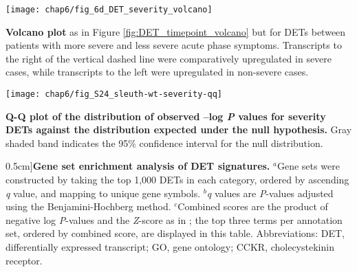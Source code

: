 \begin{marginfigure}[-9.5cm]
  \centering
  \texttt{[image: chap6/fig\_6d\_DET\_severity\_volcano]}
  \caption[Volcano plot of differentially expressed host transcripts for symptom severity]{
  \textbf{Volcano plot} as in Figure \ref{fig:DET_timepoint_volcano} but for DETs between patients with more severe and less severe acute phase symptoms. Transcripts to the right of the vertical dashed line were comparatively upregulated in severe cases, while transcripts to the left were upregulated in non-severe cases. 
  }
  \label{fig:DET_severity_volcano}
\end{marginfigure}
\begin{marginfigure}[-1cm]
  \centering
  \texttt{[image: chap6/fig\_S24\_sleuth-wt-severity-qq]}
  \caption[Q-Q plot of the distribution of observed –log \emph{P} values for severity DETs against the distribution expected under the null hypothesis]{
    \textbf{Q-Q plot of the distribution of observed –log \emph{P} values for severity DETs against the distribution expected under the null hypothesis.} Gray shaded band indicates the 95\% confidence interval for the null distribution.
  }
  \label{fig:DET_severity_qq}
\end{marginfigure}
\begin{table*}[htb]
  
  \caption[Gene set enrichment analysis of DET signatures][0.5cm]{\textbf{Gene set enrichment analysis of DET signatures.}
  $^a$Gene sets were constructed by taking the top 1,000 DETs in each category, ordered by ascending \emph{q} value, and mapping to unique gene symbols. $^b$\emph{q} values are \emph{P}-values adjusted using the Benjamini-Hochberg method. $^c$Combined scores are the product of negative log \emph{P}-values and the \emph{Z}-score as in \textcite{Chen2013}; the top three terms per annotation set, ordered by combined score, are displayed in this table. Abbreviations: DET, differentially expressed transcript; GO, gene ontology; CCKR, cholecystekinin receptor.
}
  \label{tab:chik_det_enrichr}
\end{table*}

